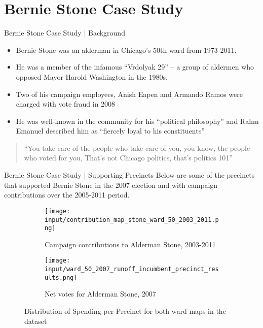 \section{Bernie Stone Case Study}
\begin{frame}{Bernie Stone Case Study | Background}
    \begin{itemize}
        \item Bernie Stone was an alderman in Chicago's 50th ward from 1973-2011. 
        \item He was a member of the infamous ``Vrdolyak 29'' -- a group of aldermen who opposed Mayor Harold Washington in the 1980s.
        \item Two of his campaign employees, Anish Eapen and Armando Ramos were charged with vote fraud in 2008
        \item He was well-known in the community for his ``political philosophy'' and Rahm Emanuel described him as ``fiercely loyal to his constituents''
    \end{itemize}
    \begin{quotation}
        ``You take care of the people who take care of you, you know, the people who voted for you, That's not Chicago politics, that's politics 101''
    \end{quotation}
\end{frame}

\begin{frame}{Bernie Stone Case Study | Supporting Precincts}
Below are some of the precincts that supported Bernie Stone in the 2007 election and with campaign contributions over the 2005-2011 period.
\begin{figure}[H]
    \centering
    \begin{subfigure}[b]{0.3\textwidth} %
    \texttt{[image: input/contribution\_map\_stone\_ward\_50\_2003\_2011.png]}
    \caption{Campaign contributions to Alderman Stone, 2003-2011}
    \end{subfigure}
    \begin{subfigure}[b]{0.3\textwidth} %
    \texttt{[image: input/ward\_50\_2007\_runoff\_incumbent\_precinct\_results.png]}
    \caption{Net votes for Alderman Stone, 2007}
    \end{subfigure}
    \caption{Distribution of Spending per Precinct for both ward maps in the dataset}
    \label{fig:stone_support_maps}
\end{figure}
\end{frame}

